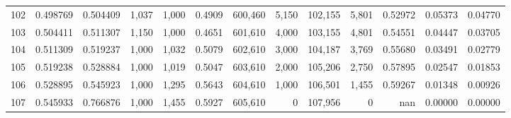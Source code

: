 \begin{tabular}{rrrrrrrrrrrrr}
102 &  0.498769 &  0.504409 &   1,037 &  1,000 &                                     0.4909 &  600,460 &    5,150 &  102,155 &    5,801 &  0.52972 &  0.05373 &  0.04770 \\
103 &  0.504411 &  0.511307 &   1,150 &  1,000 &                                     0.4651 &  601,610 &    4,000 &  103,155 &    4,801 &  0.54551 &  0.04447 &  0.03705 \\
104 &  0.511309 &  0.519237 &   1,000 &  1,032 &                                     0.5079 &  602,610 &    3,000 &  104,187 &    3,769 &  0.55680 &  0.03491 &  0.02779 \\
105 &  0.519238 &  0.528884 &   1,000 &  1,019 &                                     0.5047 &  603,610 &    2,000 &  105,206 &    2,750 &  0.57895 &  0.02547 &  0.01853 \\
106 &  0.528895 &  0.545923 &   1,000 &  1,295 &                                     0.5643 &  604,610 &    1,000 &  106,501 &    1,455 &  0.59267 &  0.01348 &  0.00926 \\
107 &  0.545933 &  0.766876 &   1,000 &  1,455 &                                     0.5927 &  605,610 &        0 &  107,956 &        0 &      nan &  0.00000 &  0.00000 \\
\bottomrule
\end{tabular}

